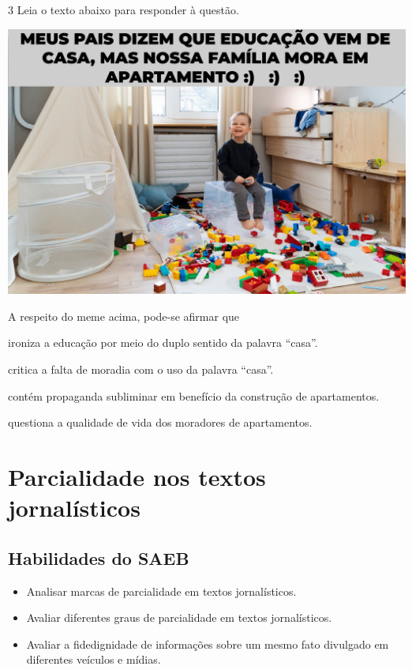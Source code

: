 \num{3} Leia o texto abaixo para responder à questão.

\includegraphics[width=\textwidth]{./imgSAEB_7_POR/media/image7.png}

A respeito do meme acima, pode-se afirmar que

\begin{escolha}
    
    \item ironiza a educação por meio do duplo sentido da palavra ``casa''.
    
    \item critica a falta de moradia com o uso da palavra ``casa''.
    
    \item contém propaganda subliminar em benefício da construção de apartamentos.
    
    \item questiona a qualidade de vida dos moradores de apartamentos.

\end{escolha}

\chapter{Parcialidade nos textos jornalísticos}

\section*{Habilidades do SAEB}

\begin{itemize}

  \item Analisar marcas de parcialidade em textos jornalísticos.

  \item Avaliar diferentes graus de parcialidade em textos jornalísticos.

  \item Avaliar a fidedignidade de informações sobre um mesmo fato divulgado 
  em diferentes veículos e mídias.

\end{itemize}

